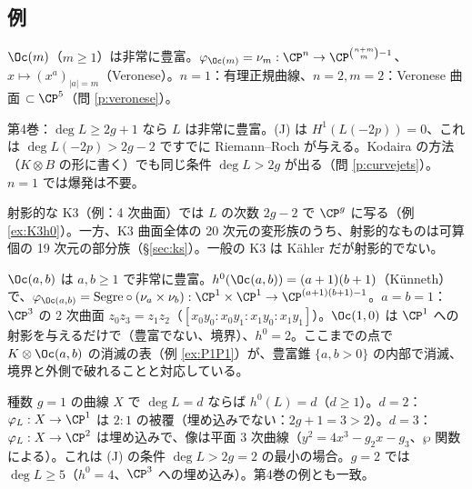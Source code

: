 \subsection{例}
\begin{ex}
$\Oc(m)$（$m\ge1$）は非常に豊富。$\varphi_{\Oc(m)}=\nu_m:\CP^n\to\CP^{\binom{n+m}m-1}$、$x\mapsto(x^a)_{|a|=m}$（Veronese）。$n=1$：有理正規曲線、$n=2,m=2$：Veronese 曲面 $\subset\CP^5$（問 \ref{p:veronese}）。
\end{ex}
\begin{ex}[曲線]
第4巻：$\deg L\ge2g+1$ なら $L$ は非常に豊富。(J) は $H^1(L(-2p))=0$、これは $\deg L(-2p)>2g-2$ ですでに Riemann--Roch が与える。Kodaira の方法（$K\otimes B$ の形に書く）でも同じ条件 $\deg L>2g$ が出る（問 \ref{p:curvejets}）。$n=1$ では爆発は不要。
\end{ex}
\begin{ex}[K3 曲面]
射影的な K3（例：4 次曲面）では $L$ の次数 $2g-2$ で $\CP^g$ に写る（例 \ref{ex:K3h0}）。一方、K3 曲面全体の 20 次元の変形族のうち、射影的なものは可算個の 19 次元の部分族（\S\ref{sec:ks}）。一般の K3 は Kähler だが射影的でない。
\end{ex}
\begin{ex}\label{ex:segre}
$\Oc(a,b)$ は $a,b\ge1$ で非常に豊富。$h^0(\Oc(a,b))=(a+1)(b+1)$（Künneth）で、$\varphi_{\Oc(a,b)}=\mathrm{Segre}\circ(\nu_a\times\nu_b):\CP^1\times\CP^1\to\CP^{(a+1)(b+1)-1}$。$a=b=1$：$\CP^3$ の 2 次曲面 $z_0z_3=z_1z_2$（$[x_0y_0:x_0y_1:x_1y_0:x_1y_1]$）。$\Oc(1,0)$ は $\CP^1$ への射影を与えるだけで（豊富でない、境界）、$h^0=2$。ここまでの点で $K\otimes\Oc(a,b)$ の消滅の表（例 \ref{ex:P1P1}）が、豊富錐 $\{a,b>0\}$ の内部で消滅、境界と外側で破れることと対応している。
\end{ex}
\begin{ex}
種数 $g=1$ の曲線 $X$ で $\deg L=d$ ならば $h^0(L)=d$（$d\ge1$）。$d=2$：$\varphi_L:X\to\CP^1$ は $2:1$ の被覆（埋め込みでない：$2g+1=3>2$）。$d=3$：$\varphi_L:X\to\CP^2$ は埋め込みで、像は平面 3 次曲線（$y^2=4x^3-g_2x-g_3$、$\wp$ 関数による）。これは (J) の条件 $\deg L>2g=2$ の最小の場合。$g=2$ では $\deg L\ge5$（$h^0=4$、$\CP^3$ への埋め込み）。第4巻の例とも一致。
\end{ex}
